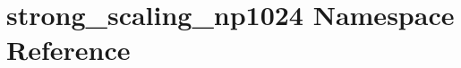 \hypertarget{namespacestrong__scaling__np1024}{}\section{strong\+\_\+scaling\+\_\+np1024 Namespace Reference}
\label{namespacestrong__scaling__np1024}
